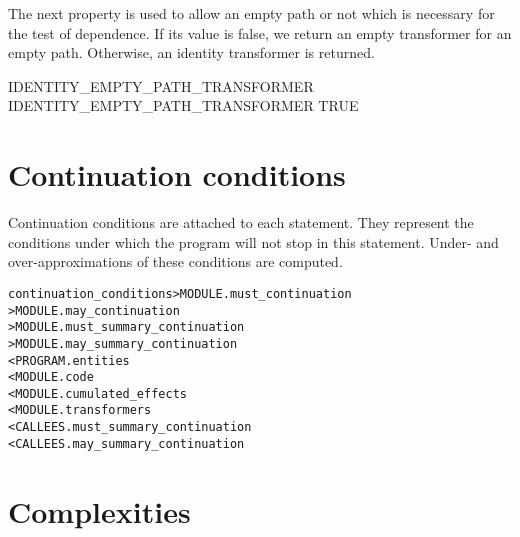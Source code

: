 \documentclass[a4paper]{report}
\newenvironment{PipsMake}{\begin{alltt}}{\end{alltt}}
\begin{document}
The next property is used to allow an empty path or not which is necessary for the test
of dependence. If its value is false, we return an empty transformer
for an empty path. Otherwise, an identity transformer is returned.

\begin{PipsProp}{IDENTITY_EMPTY_PATH_TRANSFORMER}
IDENTITY_EMPTY_PATH_TRANSFORMER TRUE
\end{PipsProp}


\section{Continuation conditions}
\label{subsection-continuation-conditions}

Continuation conditions are attached to each statement. They represent the
conditions under which the program will not stop in this statement. Under-
and over-approximations of these conditions are computed.

\begin{PipsMake}
continuation_conditions > MODULE.must_continuation
                        > MODULE.may_continuation
                        > MODULE.must_summary_continuation
                        > MODULE.may_summary_continuation
        < PROGRAM.entities
        < MODULE.code
        < MODULE.cumulated_effects
        < MODULE.transformers
        < CALLEES.must_summary_continuation
        < CALLEES.may_summary_continuation
\end{PipsMake}


\section{Complexities}
\label{subsection-complexities}
\end{document}
